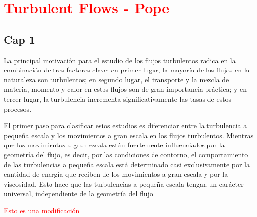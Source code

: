 


\section{\textcolor{red}{Turbulent Flows - Pope}}

\subsection{Cap 1}

La principal motivación para el estudio de los flujos turbulentos radica en la combinación de tres factores clave: en primer lugar, la mayoría de los flujos en la naturaleza son turbulentos; en segundo lugar, el transporte y la mezcla de materia, momento y calor en estos flujos son de gran importancia práctica; y en tercer lugar, la turbulencia incrementa significativamente las tasas de estos procesos. 

El primer paso para clasificar estos estudios es diferenciar entre la turbulencia a pequeña escala y los movimientos a gran escala en los flujos turbulentos. Mientras que los movimientos a gran escala están fuertemente influenciados por la geometría del flujo, es decir, por las condiciones de contorno, el comportamiento de las turbulencias a pequeña escala está determinado casi exclusivamente por la cantidad de energía que reciben de los movimientos a gran escala y por la viscosidad. Esto hace que las turbulencias a pequeña escala tengan un carácter universal, independiente de la geometría del flujo.

\textcolor{red}{Esto es una modificación}
